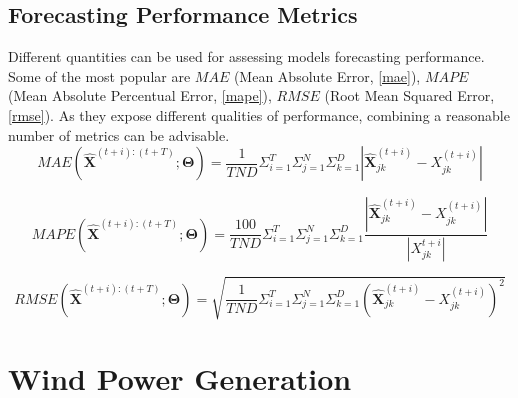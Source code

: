 \subsection{Forecasting Performance Metrics}
Different quantities can be used for assessing models forecasting performance.
Some of the most popular are $MAE$ (Mean Absolute Error, \autoref{mae}), $MAPE$ (Mean Absolute Percentual Error, \autoref{mape}), $RMSE$ (Root Mean Squared Error, \autoref{rmse}).
As they expose different qualities of performance, combining a reasonable number of metrics can be advisable.  
\begin{equation}\label{mae}
    MAE(\bm{\hat{X}}^{(t+i):(t+T)}; \bm{\Theta}) = \frac{1}{T N D} \Sigma_{i=1}^{T} \Sigma_{j=1}^{N} \Sigma_{k=1}^{D} | \bm{\hat{X}}^{(t+i)}_{jk} - X_{jk}^{(t+i)} |
\end{equation}

\begin{equation}\label{mape}
    MAPE(\bm{\hat{X}}^{(t+i):(t+T)}; \bm{\Theta}) = \frac{100}{T N D} \Sigma_{i=1}^{T} \Sigma_{j=1}^{N} \Sigma_{k=1}^{D} \frac{ | \bm{\hat{X}}^{(t+i)}_{jk} - X_{jk}^{(t+i)} | }{ |X_{jk}^{t+i}| }
\end{equation}

\begin{equation}\label{rmse}
    RMSE(\bm{\hat{X}}^{(t+i):(t+T)}; \bm{\Theta}) = \sqrt{ \frac{1}{T N D} \Sigma_{i=1}^{T} \Sigma_{j=1}^{N} \Sigma_{k=1}^{D} (\bm{\hat{X}}^{(t+i)}_{jk} - X_{jk}^{(t+i)})^2 }
\end{equation}


\section{Wind Power Generation}
